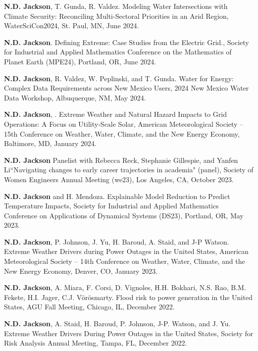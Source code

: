 \documentclass{article}[12pt]
\begin{document}
\begin{etaremune}[]
		\item \textbf{N.D. Jackson}, T. Gunda, R. Valdez. Modeling Water Intersections with Climate Security: Reconciling Multi-Sectoral Priorities in an Arid Region, WaterSciCon2024, St. Paul, MN, June 2024.
		
		\item \textbf{N.D. Jackson}. Defining Extreme: Case Studies from the Electric Grid., Society for Industrial and Applied Mathematics Conference on the Mathematics of Planet Earth (MPE24), Portland, OR, June 2024. 
		
		\item \textbf{N.D. Jackson}, R. Valdez, W. Peplinski, and T. Gunda. Water for Energy: Complex Data Requirements across New Mexico Users, 2024 New Mexico Water Data Workshop, Albuquerque, NM, May 2024. 
		
		\item \textbf{N.D. Jackson},  . Extreme Weather and Natural Hazard Impacts to Grid Operations: A Focus on Utility-Scale Solar, American Meteorological Society -- 15th Conference on Weather, Water, Climate, and the New Energy Economy, Baltimore, MD, January 2024. 
		
		\item \textbf{N.D. Jackson} Panelist with Rebecca Reck, Stephanie Gillespie, and Yanfen Li``Navigating changes to early career trajectories in academia" (panel), Society of Women Engineers Annual Meeting (we23), Los Angeles, CA, October 2023. 
		
		\item \textbf{N.D. Jackson} and H. Mendoza. Explainable Model Reduction to Predict Temperature Impacts, Society for Industrial and Applied Mathematics Conference on Applications of Dynamical Systems (DS23), Portland, OR, May 2023. 
		
		\item \textbf{N.D. Jackson}, P. Johnson, J. Yu, H. Baroud, A. Staid, and J-P Watson. Extreme Weather Drivers during Power Outages in the United States, American Meteorological Society -- 14th Conference on Weather, Water, Climate, and the New Energy Economy, Denver, CO, January 2023.
		
		\item \textbf{N.D. Jackson}, A. Miara, F. Corsi, D. Vignoles, H.H. Bokhari, N.S. Rao, B.M. Fekete, H.I. Jager, C.J. V\"{o}r\"{o}smarty. Flood risk to power generation in the United States, AGU Fall Meeting, Chicago, IL, December 2022. 
		
		\item \textbf{N.D. Jackson}, A. Staid, H. Baroud, P. Johnson, J-P. Watson, and J. Yu. Extreme Weather Drivers During Power Outages in the United States, Society for Risk Analysis Annual Meeting, Tampa, FL, December 2022. 
		

\end{etaremune}
\end{document}
